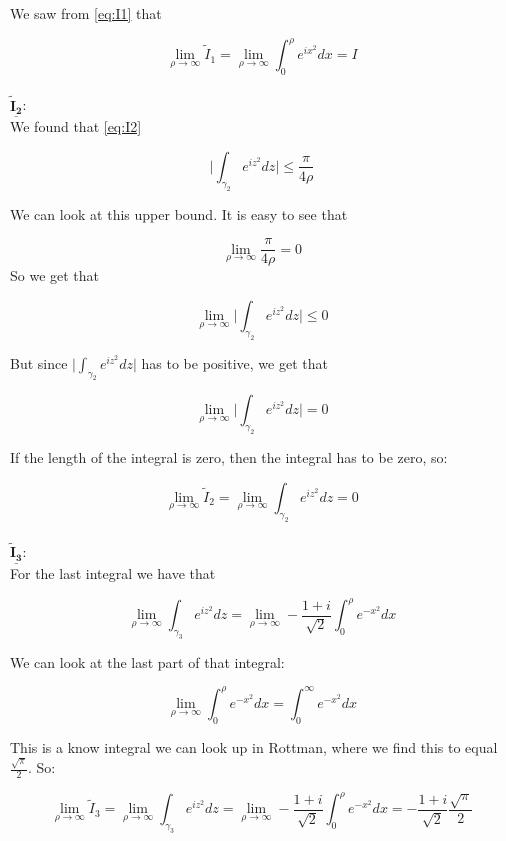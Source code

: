 \documentclass[a4paper,norsk, 10pt]{article}
\begin{document}
We saw from \ref{eq:I1} that

\begin{equation}
\lim_{\rho \rightarrow \infty} \tilde{I}_1 = \lim_{\rho \rightarrow \infty} \int_0^{\rho} e^{ix^2} dx = I
\label{eq:I1rhoInf}
\end{equation}\\

$\underline{\mathbf{\tilde{I}_2}}$:\\

We found that \ref{eq:I2}

$$
\bigg|\int_{\gamma_2}e^{iz^2}dz \bigg| \leq \frac{\pi}{4\rho}
$$

We can look at this upper bound. It is easy to see that

$$
\lim_{\rho\rightarrow \infty} \frac{\pi}{4\rho} = 0
$$
So we get that

$$
\lim_{\rho \rightarrow \infty } \bigg|\int_{\gamma_2}e^{iz^2}dz \bigg| \leq 0
$$

But since $\big|\int_{\gamma_2}e^{iz^2}dz \big|$ has to be positive, we get that

$$
\lim_{\rho \rightarrow \infty } \bigg|\int_{\gamma_2}e^{iz^2}dz \bigg| = 0
$$

If the length of the integral is zero, then the integral has to be zero, so:

\begin{equation}
\lim_{\rho \rightarrow \infty} \tilde{I}_2 = \lim_{\rho \rightarrow \infty}  \int_{\gamma_2}e^{iz^2}dz = 0
\label{I2rhoInf}
\end{equation}\\

$\underline{\mathbf{\tilde{I}_3}}$:\\

For the last integral we have that 

$$
\lim_{\rho \rightarrow \infty}  \int_{\gamma_3}e^{iz^2}dz = \lim_{\rho \rightarrow \infty} -\frac{1+i}{\sqrt{2}}  \int_0^{\rho}e^{-x^2}dx 
$$

We can look at the last part of that integral:

$$
\lim_{\rho \rightarrow \infty} \int_0^{\rho}e^{-x^2}dx  = \int_0^{\infty}e^{-x^2}dx
$$

This is a know integral we can look up in Rottman, where we find this to equal $\frac{\sqrt{\pi}}{2}$. So:

\begin{equation}
\lim_{\rho \rightarrow \infty} \tilde{I}_3 = \lim_{\rho \rightarrow \infty} \int_{\gamma_3}e^{iz^2}dz = \lim_{\rho \rightarrow \infty} -\frac{1+i}{\sqrt{2}}  \int_0^{\rho}e^{-x^2}dx = -\frac{1+i}{\sqrt{2}} \frac{\sqrt{\pi}}{2}
\label{I3rhoinf}
\end{equation}\\
\end{document}
